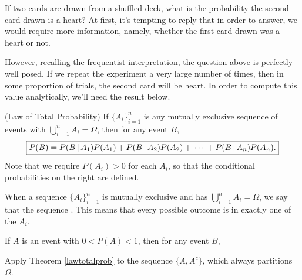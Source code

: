 If two cards are drawn from a shuffled deck, what is the probability the second card drawn is a heart? At first, it's tempting to reply that in order to answer, we would require more information, namely, whether the first card drawn was a heart or not.
\par
However, recalling the frequentist interpretation, the question above is perfectly well posed. If we repeat the experiment a very large number of times, then in some proportion of trials, the second card will be heart. In order to compute this value analytically, we'll need the result below.
\par
\begin{thm}\label{lawtotalprob}
(Law of Total Probability) If $\{A_i\}_{i=1}^{n}$ is any mutually exclusive sequence of events with $\bigcup_{i=1}^{n}A_i = \Omega$, then for any event $B$,
$$\boxed{P(B) = P(B \,|\, A_1)P(A_1) + P(B \,|\, A_2)P(A_2)+ \, \cdots \, + P(B \,|\, A_n)P(A_n).}$$
\noindent Note that we require $P(A_i) > 0$ for each $A_i$, so that the conditional probabilities on the right are defined.
\end{thm}
\par
When a sequence $\{A_i\}_{i=1}^{n}$ is mutually exclusive and has $\bigcup_{i=1}^{n}A_i = \Omega$, we say that the sequence . This means that every possible outcome is in exactly one of the $A_i$.

\begin{center}
\end{center}

\begin{cor} If $A$ is an event with $0 < P(A) < 1$, then for any event $B$, 
\end{cor}
\begin{pf} Apply Theorem \ref{lawtotalprob} to the sequence $\{A, A^c\}$, which always partitions $\Omega$.
\end{pf}

